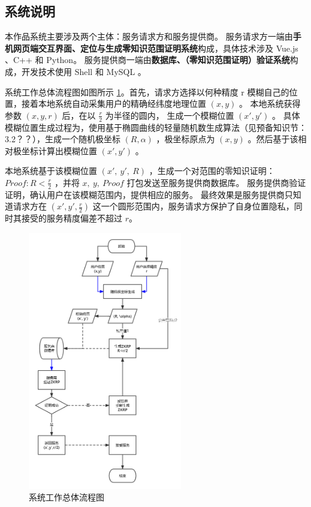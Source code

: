 \documentclass[zihao=-4]{ctexart}
\begin{document}
\subsection{系统说明}
本作品系统主要涉及两个主体：服务请求方和服务提供商。
服务请求方一端由\textbf{手机网页端交互界面、定位与生成零知识范围证明系统}构成，具体技术涉及 Vue.js 、C++ 和 Python。
服务提供商一端由\textbf{数据库、（零知识范围证明）验证系统}构成，开发技术使用 Shell 和 MySQL 。
\par
系统工作总体流程图如图所示 \ref{flowchart}。首先，请求方选择以何种精度 r 模糊自己的位置，接着本地系统自动采集用户的精确经纬度地理位置 $(x, y)$ 。
本地系统获得参数 $(x, y, r)$ 后，在以 $\frac{r}{2}$ 为半径的圆内， 生成一个模糊位置 $(x',y')$ 。
具体模糊位置生成过程为，使用基于椭圆曲线的轻量随机数生成算法（见预备知识节：3.2？？），生成一个随机极坐标 $(R, \alpha)$ ，极坐标原点为 $(x,y)$ 。然后基于该相对极坐标计算出模糊位置 $(x',y')$ 。
\par
本地系统基于该模糊位置 $(x',\ y',\ R)$ ，生成一个对范围的零知识证明：$Proof: R<\frac{r}{2}$ ，并将 $x,\ y,\ Proof$ 打包发送至服务提供商数据库。
服务提供商验证证明，确认用户在该模糊范围内，提供相应的服务。
最终效果是服务提供商只知道请求方在 $(x',y',\frac{r}{2})$ 这一个圆形范围内，服务请求方保护了自身位置隐私，同时其接受的服务精度偏差不超过 $r$。
\begin{figure}[H] %
    \centering %
    \includegraphics[width=0.6\textwidth]{系统工作流程图.jpg} %
    \caption{系统工作总体流程图} %
    \label{flowchart} %
\end{figure}
\end{document}
